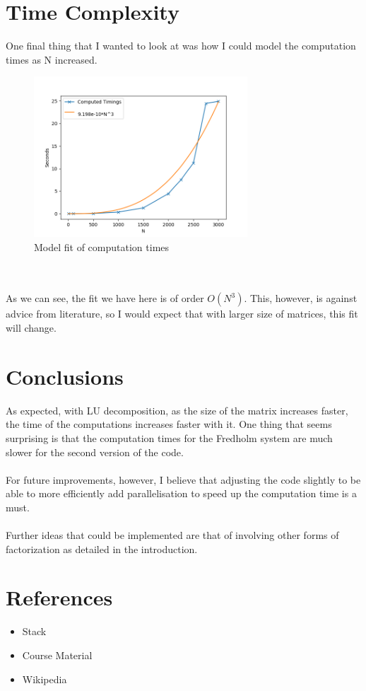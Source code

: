 \documentclass{article}
\begin{document}
\section{Time Complexity}
One final thing that I wanted to look at was how I could model the computation times as N increased.
\begin{figure}[htb]
\begin{center}
\includegraphics[width=8cm]{model_fit.png}
\caption{Model fit of computation times}
\end{center}
\end{figure}
\\\\
As we can see, the fit we have here is of order $O(N^3)$. This, however, is against advice from literature, so I would expect that with larger size of matrices, this fit will change.
\section{Conclusions}
As expected, with LU decomposition, as the size of the matrix increases faster, the time of the computations increases faster with it. One thing that seems surprising is that the computation times for the Fredholm system are much slower for the second version of the code. \\\\
For future improvements, however, I believe that adjusting the code slightly to be able to more efficiently add parallelisation to speed up the computation time is a must.
\\\\
Further ideas that could be implemented are that of involving other forms of factorization as detailed in the introduction.
\section{References}
\begin{itemize}
    \item Stack
    \item Course Material
    \item Wikipedia
\end{itemize}
\newpage
\end{document}
